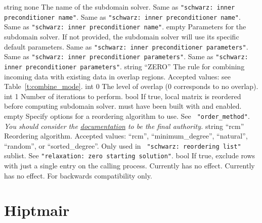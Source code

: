     {string}
    {none}
    {The name of the subdomain solver.}
    {Same as {\tt "schwarz: inner preconditioner name"}.}
    {Same as {\tt "schwarz: inner preconditioner name"}.}
    {Same as {\tt "schwarz: inner preconditioner name"}.}
    {\parameterlist}
    {empty}
    {Parameters for the subdomain solver. If not provided, the subdomain solver
     will use its specific default parameters.}
    {Same as {\tt "schwarz: inner preconditioner parameters"}.}
    {Same as {\tt "schwarz: inner preconditioner parameters"}.}
    {Same as {\tt "schwarz: inner preconditioner parameters"}.}
    {string}
    {``ZERO''}
    {The rule for combining incoming data with existing data in overlap regions.
     Accepted values: see Table~\ref{t:combine_mode}.}
    {int}
    {0}
    {The level of overlap (0 corresponds to no overlap).}
    {int}
    {1}
    {Number of iterations to perform.}
    {bool}
    {\false}
    {If true, local matrix is reordered before computing subdomain solver. \trilinos must have been built with
     \zoltantwo and \xpetra enabled.}
    {\parameterlist}
    {empty}
    {Specify options for a \zoltantwo reordering algorithm to use. See {\tt
     "order\_method"}. {\em You should consider the
     \href{http://trilinos.org/docs/dev/packages/zoltan2/doc/html/z2_parameters.html}{\zoltantwo
     documentation} to be the final authority.}}
    {string}
    {``rcm''}
    {Reordering algorithm. Accepted values: ``rcm'', ``minimum\_degree'',
     ``natural'', ``random'', or ``sorted\_degree''. Only used in {\tt
     "schwarz: reordering list"} sublist.}
    {See {\tt "relaxation: zero starting solution"}.}
    {bool}
    {\false}
    {If true, exclude rows with just a single entry on the calling process.}
    {Currently has no effect.}
    {Currently has no effect. For backwards compatibility only.}

\section{Hiptmair}

